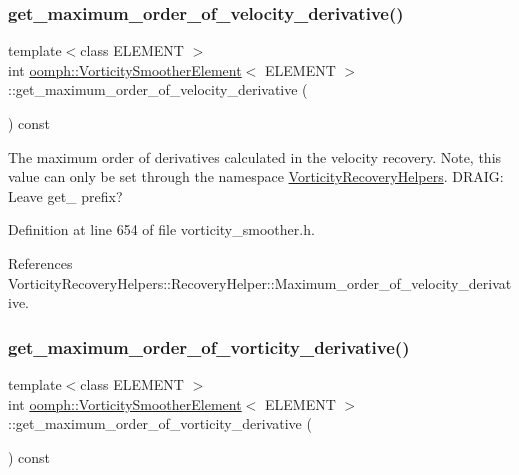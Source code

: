 \subsubsection{\texorpdfstring{get\+\_\+maximum\+\_\+order\+\_\+of\+\_\+velocity\+\_\+derivative()}{get\_maximum\_order\_of\_velocity\_derivative()}}
{\footnotesize\ttfamily template$<$class E\+L\+E\+M\+E\+NT $>$ \\
int \hyperlink{classoomph_1_1VorticitySmootherElement}{oomph\+::\+Vorticity\+Smoother\+Element}$<$ E\+L\+E\+M\+E\+NT $>$\+::get\+\_\+maximum\+\_\+order\+\_\+of\+\_\+velocity\+\_\+derivative (\begin{DoxyParamCaption}{ }\end{DoxyParamCaption}) const\hspace{0.3cm}{\ttfamily [inline]}}



The maximum order of derivatives calculated in the velocity recovery. Note, this value can only be set through the namespace \hyperlink{namespaceVorticityRecoveryHelpers}{Vorticity\+Recovery\+Helpers}. D\+R\+A\+IG\+: Leave get\+\_\+ prefix? 



Definition at line 654 of file vorticity\+\_\+smoother.\+h.



References Vorticity\+Recovery\+Helpers\+::\+Recovery\+Helper\+::\+Maximum\+\_\+order\+\_\+of\+\_\+velocity\+\_\+derivative.

\mbox{\label{classoomph_1_1VorticitySmootherElement_aad7f79c7cf34ceeb090153881b070f1f}} 
\subsubsection{\texorpdfstring{get\+\_\+maximum\+\_\+order\+\_\+of\+\_\+vorticity\+\_\+derivative()}{get\_maximum\_order\_of\_vorticity\_derivative()}}
{\footnotesize\ttfamily template$<$class E\+L\+E\+M\+E\+NT $>$ \\
int \hyperlink{classoomph_1_1VorticitySmootherElement}{oomph\+::\+Vorticity\+Smoother\+Element}$<$ E\+L\+E\+M\+E\+NT $>$\+::get\+\_\+maximum\+\_\+order\+\_\+of\+\_\+vorticity\+\_\+derivative (\begin{DoxyParamCaption}{ }\end{DoxyParamCaption}) const\hspace{0.3cm}{\ttfamily [inline]}}



